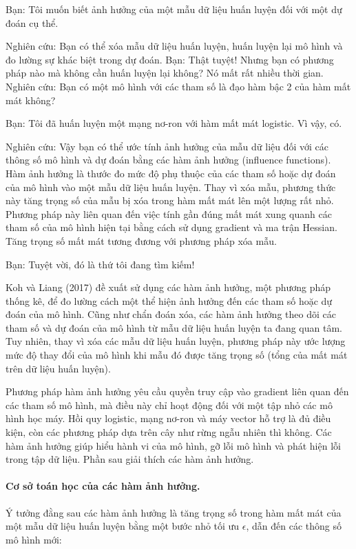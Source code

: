 Bạn: Tôi muốn biết ảnh hưởng của một mẫu dữ liệu huấn luyện đối với một dự đoán cụ thể.

Nghiên cứu: Bạn có thể xóa mẫu dữ liệu huấn luyện, huấn luyện lại mô hình và đo lường sự khác biệt trong dự đoán.
Bạn: Thật tuyệt! Nhưng bạn có phương pháp nào mà không cần huấn luyện lại không? Nó mất rất nhiều thời gian.
Nghiên cứu: Bạn có một mô hình với các tham số là đạo hàm bậc 2 của hàm mất mát không?

Bạn: Tôi đã huấn luyện một mạng nơ-ron với hàm mất mát logistic. Vì vậy, có.

Nghiên cứu: Vậy bạn có thể ước tính ảnh hưởng của mẫu dữ liệu đối với các thông số mô hình và dự đoán bằng các hàm ảnh hưởng (influence functions). Hàm ảnh hưởng là thước đo mức độ phụ thuộc của các tham số hoặc dự đoán của mô hình vào một mẫu dữ liệu huấn luyện. Thay vì xóa mẫu, phương thức này tăng trọng số của mẫu bị xóa trong hàm mất mát lên một lượng rất nhỏ. Phương pháp này liên quan đến việc tính gần đúng mất mát xung quanh các tham số của mô hình hiện tại bằng cách sử dụng gradient và ma trận Hessian. Tăng trọng số mất mát tương đương với phương pháp xóa mẫu.

Bạn: Tuyệt vời, đó là thứ tôi đang tìm kiếm!

Koh và Liang (2017) đề xuất sử dụng các hàm ảnh hưởng, một phương pháp thống kê, để đo lường cách một thể hiện ảnh hưởng đến các tham số hoặc dự đoán của mô hình. Cũng như chẩn đoán xóa, các hàm ảnh hưởng theo dõi các tham số và dự đoán của mô hình từ mẫu dữ liệu huấn luyện ta đang quan tâm. Tuy nhiên, thay vì xóa các mẫu dữ liệu huấn luyện, phương pháp này ước lượng mức độ thay đổi của mô hình khi mẫu đó được tăng trọng số (tổng của mất mát trên dữ liệu huấn luyện).

Phương pháp hàm ảnh hưởng yêu cầu quyền truy cập vào gradient liên quan đến các tham số mô hình, mà điều này chỉ hoạt động đối với một tập nhỏ các mô hình học máy. Hồi quy logistic, mạng nơ-ron và máy vector hỗ trợ là đủ điều kiện, còn các phương pháp dựa trên cây như rừng ngẫu nhiên thì không. Các hàm ảnh hưởng giúp hiểu hành vi của mô hình, gỡ lỗi mô hình và phát hiện lỗi trong tập dữ liệu. Phần sau giải thích các hàm ảnh hưởng.

\paragraph{Cơ sở toán học của các hàm ảnh hưởng.}

Ý tưởng đằng sau các hàm ảnh hưởng là tăng trọng số trong hàm mất mát của một mẫu dữ liệu huấn luyện bằng một bước nhỏ tối ưu $\epsilon$, dẫn đến các thông số mô hình mới:

